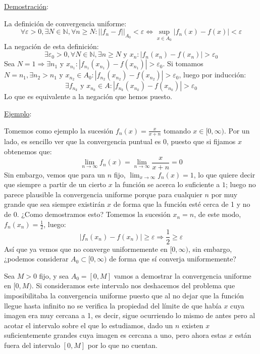 \documentclass[10pt,a4paper,openright]{book}
\begin{document}
\underline{Demostración}:

La definición de convergencia uniforme:
$$\forall \varepsilon > 0, \exists N \in \mathbb{N}, \forall n \geq N : ||f_n - f||_{A_0} < \varepsilon \Leftrightarrow \underset{x \in A_0}{\sup} |f_n(x) - f(x)| < \varepsilon$$
La negación de esta definición:
$$\exists \varepsilon_0 > 0, \forall N \in \mathbb{N},  \exists n \geq N  \mbox{ y } x_n: |f_n(x_n) - f(x_n)| > \varepsilon_0$$
Sea $N = 1 \Rightarrow \exists n_1 \mbox{ y } x_{n_1} :  |f_{n_1} (x_{n_1}) - f(x_{n_1})| > \varepsilon_0$. Si tomamos $N=n_1, \exists n_2 > n_1 \mbox{ y } x_{n_2} \in A_0 : |f_{n_2} (x_{n_2}) - f(x_{n_2})| > \varepsilon_0$, luego por inducción:
$$\exists f_{n_k} \mbox{ y } x_{n_k}\in A : |f_{n_k} (x_{n_k}) - f(x_{n_k})| > \varepsilon_0$$
Lo que es equivalente a la negación que hemos puesto.

\underline{Ejemplo}:

Tomemos como ejemplo la sucesión $f_n(x) = \frac{x}{x+n}$ tomando $x\in [0,\infty)$. Por un lado, es sencillo ver que la convergencia puntual es 0, puesto que si fijamos $x$ obtenemos que:
$$\lim_{n \rightarrow \infty} f_n(x) =\lim_{n \rightarrow \infty} \frac{x}{x+n} = 0$$
Sin embargo, vemos que para un $n$ fijo, $\lim_{x \rightarrow \infty} f_n(x) = 1$, lo que quiere decir que siempre a partir de un cierto $x$ la función se acerca lo suficiente a $1$; luego no parece plausible la convergencia uniforme porque para cualquier $n$ por muy grande que sea siempre existirán $x$ de forma que la función esté cerca de 1 y no de 0. ¿Como demostramos esto? Tomemos la sucesión $x_n = n$, de este modo, $f_n(x_n) = \frac{1}{2}$, luego:
$$|f_n(x_n)-f(x_n)|\geq \varepsilon\Rightarrow \frac{1}{2} \geq \varepsilon$$
Así que ya vemos que no converge uniformemente en $[0,\infty)$, sin embargo, ¿podemos considerar $A_0\subset [0,\infty)$ de forma que sí converja uniformemente?

Sea $M > 0$ fijo, y sea $A_0 = [0,M]$ vamos a demostrar la convergencia uniforme en $[0,M)$. Si consideramos este intervalo nos deshacemos del problema que imposibilitaba la convergencia uniforme puesto que al no dejar que la función llegue hasta infinito no se verifica la propiedad del límite de que había $x$ cuya imagen era muy cercana a 1, es decir, sigue ocurriendo lo mismo de antes pero al acotar el intervalo sobre el que lo estudiamos, dado un $n$ existen $x$ suficientemente grandes cuya imagen es cercana a uno, pero ahora estas $x$ están fuera del intervalo $[0,M]$ por lo que no cuentan.
\end{document}
